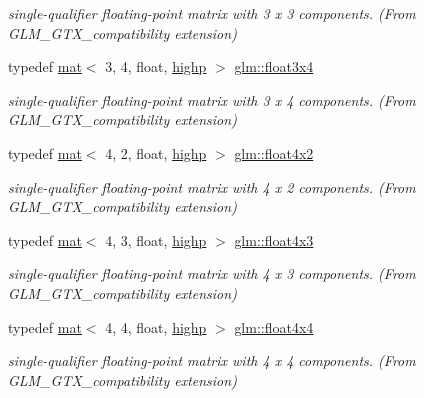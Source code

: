 \begin{DoxyCompactItemize}
\begin{DoxyCompactList}\small\item\em single-\/qualifier floating-\/point matrix with 3 x 3 components. (From G\+L\+M\+\_\+\+G\+T\+X\+\_\+compatibility extension) \end{DoxyCompactList}\item 
typedef \mbox{\hyperlink{structglm_1_1mat}{mat}}$<$ 3, 4, float, \mbox{\hyperlink{namespaceglm_a36ed105b07c7746804d7fdc7cc90ff25ac6f7eab42eacbb10d59a58e95e362074}{highp}} $>$ \mbox{\hyperlink{group__gtx__compatibility_ga53ae5a5af5943b6557eda4a6502e4484}{glm\+::float3x4}}
\begin{DoxyCompactList}\small\item\em single-\/qualifier floating-\/point matrix with 3 x 4 components. (From G\+L\+M\+\_\+\+G\+T\+X\+\_\+compatibility extension) \end{DoxyCompactList}\item 
typedef \mbox{\hyperlink{structglm_1_1mat}{mat}}$<$ 4, 2, float, \mbox{\hyperlink{namespaceglm_a36ed105b07c7746804d7fdc7cc90ff25ac6f7eab42eacbb10d59a58e95e362074}{highp}} $>$ \mbox{\hyperlink{group__gtx__compatibility_gac7ba369299599a807491b9e871a0184e}{glm\+::float4x2}}
\begin{DoxyCompactList}\small\item\em single-\/qualifier floating-\/point matrix with 4 x 2 components. (From G\+L\+M\+\_\+\+G\+T\+X\+\_\+compatibility extension) \end{DoxyCompactList}\item 
typedef \mbox{\hyperlink{structglm_1_1mat}{mat}}$<$ 4, 3, float, \mbox{\hyperlink{namespaceglm_a36ed105b07c7746804d7fdc7cc90ff25ac6f7eab42eacbb10d59a58e95e362074}{highp}} $>$ \mbox{\hyperlink{group__gtx__compatibility_ga656a2d21cf92696b10063da4f431eecd}{glm\+::float4x3}}
\begin{DoxyCompactList}\small\item\em single-\/qualifier floating-\/point matrix with 4 x 3 components. (From G\+L\+M\+\_\+\+G\+T\+X\+\_\+compatibility extension) \end{DoxyCompactList}\item 
typedef \mbox{\hyperlink{structglm_1_1mat}{mat}}$<$ 4, 4, float, \mbox{\hyperlink{namespaceglm_a36ed105b07c7746804d7fdc7cc90ff25ac6f7eab42eacbb10d59a58e95e362074}{highp}} $>$ \mbox{\hyperlink{group__gtx__compatibility_ga32ecd052006dea588730d2a077c5896c}{glm\+::float4x4}}
\begin{DoxyCompactList}\small\item\em single-\/qualifier floating-\/point matrix with 4 x 4 components. (From G\+L\+M\+\_\+\+G\+T\+X\+\_\+compatibility extension) \end{DoxyCompactList}\item 

\end{DoxyCompactItemize}
